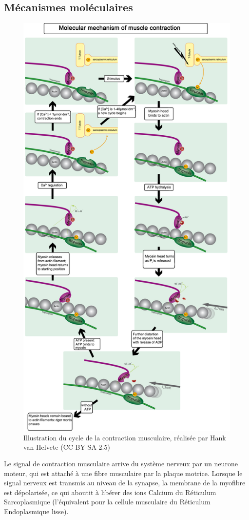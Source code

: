 \subsection{Mécanismes moléculaires}
\begin{figure}[p]
\includegraphics[scale=0.3]{Figures/Contraction.png}
\caption{Illustration du cycle de la contraction musculaire, réalisée par Hank van Helvete (CC BY-SA 2.5)}
\end{figure}
Le signal de contraction musculaire arrive du système nerveux par un neurone moteur, qui est attaché à une fibre musculaire par la plaque motrice.
Lorsque le signal nerveux est transmis au niveau de la synapse, la membrane de la myofibre est dépolarisée, ce qui aboutit à libérer des ions Calcium du Réticulum Sarcoplasmique (l'équivalent pour la cellule musculaire du Réticulum Endoplasmique lisse). 

